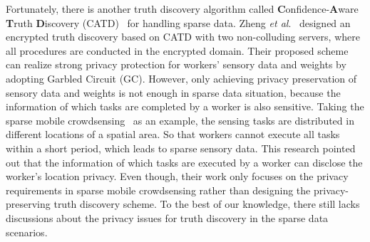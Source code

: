 \documentclass[conference]{IEEEtran}
\begin{document}
Fortunately, there is another truth discovery algorithm called {\bf C}onfidence-{\bf A}ware {\bf T}ruth {\bf D}iscovery (CATD)~\cite{li_confidence-aware_2014} for handling sparse data.
Zheng {\em et al}.~\cite{zheng_learning_2018} designed an encrypted truth discovery based on CATD with two non-colluding servers, where all procedures are conducted in the encrypted domain.
Their proposed scheme can realize strong privacy protection for workers' sensory data and weights by adopting Garbled Circuit (GC).
However, only achieving privacy preservation of sensory data and weights is not enough in sparse data situation, because the information of which tasks are completed by a worker is also sensitive.
Taking the sparse mobile crowdsensing~\cite{wang_sparse_2020} as an example, the sensing tasks are distributed in different locations of a spatial area.
So that workers cannot execute all tasks within a short period, which leads to sparse sensory data.
This research pointed out that the information of which tasks are executed by a worker can disclose the worker's location privacy.
Even though, their work only focuses on the privacy requirements in sparse mobile crowdsensing rather than designing the privacy-preserving truth discovery scheme.
To the best of our knowledge, there still lacks discussions about the privacy issues for truth discovery in the sparse data scenarios.
\end{document}
